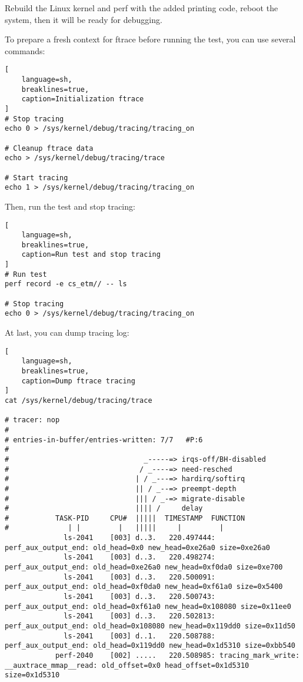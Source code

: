 \documentclass[11pt]{diazessay} %
\begin{document}
Rebuild the Linux kernel and perf with the added printing code, reboot the
system, then it will be ready for debugging.

To prepare a fresh context for ftrace before running the test, you can use
several commands:

\begin{lstlisting}[
  	language=sh,
	breaklines=true,
	caption=Initialization ftrace
]
# Stop tracing
echo 0 > /sys/kernel/debug/tracing/tracing_on

# Cleanup ftrace data
echo > /sys/kernel/debug/tracing/trace

# Start tracing
echo 1 > /sys/kernel/debug/tracing/tracing_on
\end{lstlisting}

Then, run the test and stop tracing:

\begin{lstlisting}[
  	language=sh,
	breaklines=true,
	caption=Run test and stop tracing
]
# Run test
perf record -e cs_etm// -- ls

# Stop tracing
echo 0 > /sys/kernel/debug/tracing/tracing_on
\end{lstlisting}

At last, you can dump tracing log:

\begin{lstlisting}[
  	language=sh,
	breaklines=true,
	caption=Dump ftrace tracing
]
cat /sys/kernel/debug/tracing/trace

# tracer: nop
#
# entries-in-buffer/entries-written: 7/7   #P:6
#
#                                _-----=> irqs-off/BH-disabled
#                               / _----=> need-resched
#                              | / _---=> hardirq/softirq
#                              || / _--=> preempt-depth
#                              ||| / _-=> migrate-disable
#                              |||| /     delay
#           TASK-PID     CPU#  |||||  TIMESTAMP  FUNCTION
#              | |         |   |||||     |         |
              ls-2041    [003] d..3.   220.497444: perf_aux_output_end: old_head=0x0 new_head=0xe26a0 size=0xe26a0
              ls-2041    [003] d..3.   220.498274: perf_aux_output_end: old_head=0xe26a0 new_head=0xf0da0 size=0xe700
              ls-2041    [003] d..3.   220.500091: perf_aux_output_end: old_head=0xf0da0 new_head=0xf61a0 size=0x5400
              ls-2041    [003] d..3.   220.500743: perf_aux_output_end: old_head=0xf61a0 new_head=0x108080 size=0x11ee0
              ls-2041    [003] d..3.   220.502813: perf_aux_output_end: old_head=0x108080 new_head=0x119dd0 size=0x11d50
              ls-2041    [003] d..1.   220.508788: perf_aux_output_end: old_head=0x119dd0 new_head=0x1d5310 size=0xbb540
            perf-2040    [002] .....   220.508985: tracing_mark_write: __auxtrace_mmap__read: old_offset=0x0 head_offset=0x1d5310 size=0x1d5310
\end{lstlisting}
\end{document}
